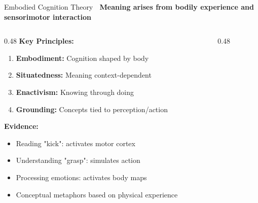 \documentclass[aspectratio=169]{beamer}
\begin{document}
\begin{frame}[shrink=10]{Embodied Cognition Theory 🏃}
\textbf{Meaning arises from bodily experience and sensorimotor interaction}

\vspace{1em}

\begin{columns}[T]
\begin{column}{0.48\textwidth}
\textbf{Key Principles:}
\begin{enumerate}\setlength{\itemsep}{0pt}
    \item \textbf{Embodiment:} Cognition shaped by body
    \item \textbf{Situatedness:} Meaning context-dependent
    \item \textbf{Enactivism:} Knowing through doing
    \item \textbf{Grounding:} Concepts tied to perception/action
\end{enumerate}

\vspace{0.5em}
\textbf{Evidence:}
\begin{itemize}\setlength{\itemsep}{0pt}
    \item Reading "kick": activates motor cortex
    \item Understanding "grasp": simulates action
    \item Processing emotions: activates body maps
    \item Conceptual metaphors based on physical experience
\end{itemize}
\end{column}

\begin{column}{0.48\textwidth}
\begin{center}
\end{center}
\end{column}
\end{columns}
\end{frame}
\end{document}
